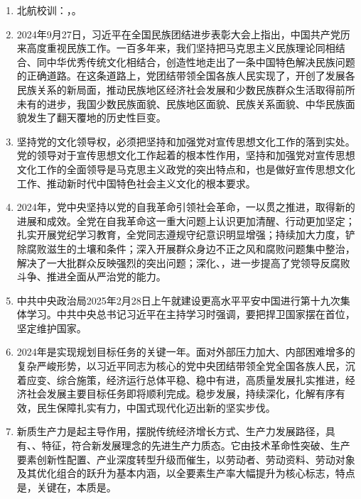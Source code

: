 \documentclass[UTF8,11pt,a4paper]{ctexart}
\begin{document}
\begin{enumerate}[label=\textbf{\arabic*.}, leftmargin=2.5em, itemsep=0.5em]
\item 北航校训：，。
\item 2024年9月27日，习近平在全国民族团结进步表彰大会上指出，中国共产党历来高度重视民族工作。一百多年来，我们坚持把马克思主义民族理论同相结合、同中华优秀传统文化相结合，创造性地走出了一条中国特色解决民族问题的正确道路。在这条道路上，党团结带领全国各族人民实现了，开创了发展各民族关系的新局面，推动民族地区经济社会发展和少数民族群众生活取得前所未有的进步，我国少数民族面貌、民族地区面貌、民族关系面貌、中华民族面貌发生了翻天覆地的历史性巨变。
\item 坚持党的文化领导权，必须把坚持和加强党对宣传思想文化工作的落到实处。党的领导对于宣传思想文化工作起着的根本性作用，坚持和加强党对宣传思想文化工作的全面领导是马克思主义政党的突出特点和，也是做好宣传思想文化工作、推动新时代中国特色社会主义文化的根本要求。
\item 2024年，党中央坚持以党的自我革命引领社会革命，一以贯之推进，取得新的进展和成效。全党在自我革命这一重大问题上认识更加清醒、行动更加坚定；扎实开展党纪学习教育，全党同志遵规守纪意识明显增强；持续加大力度，铲除腐败滋生的土壤和条件；深入开展群众身边不正之风和腐败问题集中整治，解决了一大批群众反映强烈的突出问题；深化、，进一步提高了党领导反腐败斗争、推进全面从严治党的能力。
\item 中共中央政治局2025年2月28日上午就建设更高水平平安中国进行第十九次集体学习。中共中央总书记习近平在主持学习时强调，要把捍卫国家摆在首位，坚定维护国家。
\item 2024年是实现规划目标任务的关键一年。面对外部压力加大、内部困难增多的复杂严峻形势，以习近平同志为核心的党中央团结带领全党全国各族人民，沉着应变、综合施策，经济运行总体平稳、稳中有进，高质量发展扎实推进，经济社会发展主要目标任务即将顺利完成。稳步发展，持续深化，化解有序有效，民生保障扎实有力，中国式现代化迈出新的坚实步伐。
\item 新质生产力是起主导作用，摆脱传统经济增长方式、生产力发展路径，具有、、特征，符合新发展理念的先进生产力质态。它由技术革命性突破、生产要素创新性配置、产业深度转型升级而催生，以劳动者、劳动资料、劳动对象及其优化组合的跃升为基本内涵，以全要素生产率大幅提升为核心标志，特点是，关键在，本质是。

\end{enumerate}
\end{document}
